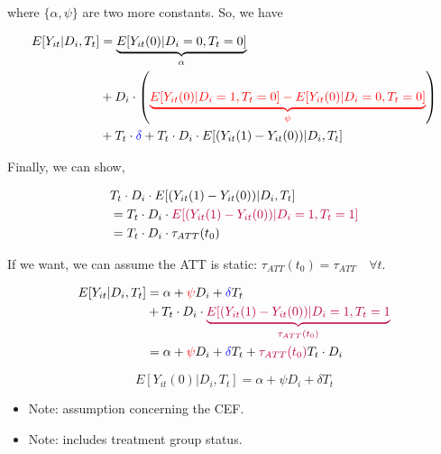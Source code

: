\documentclass[
  letterpaper,
  DIV=11,
  numbers=noendperiod]{scrreprt}
\providecommand{\tightlist}{%
  \setlength{\itemsep}{0pt}\setlength{\parskip}{0pt}}\usepackage{longtable,booktabs,array}
\theoremstyle{definition}
\theoremstyle{remark}
\begin{document}
where \(\{ \alpha, \psi \}\) are two more constants. So, we have

\[
\begin{aligned}
E[Y_{it}|D_i,T_t] &= \underbrace{E[Y_{it}(0)|D_i=0,T_t=0]}_{\alpha} \\
&+ D_i \cdot \left( \textcolor{red}{\underbrace{E[Y_{it}(0)|D_i=1,T_t=0] - E[Y_{it}(0)|D_i=0,T_t=0]}_{\psi}} \right) \\
&+ T_t \cdot \textcolor{blue}{\delta} + T_t \cdot D_i \cdot E[(Y_{it}(1)-Y_{it}(0))|D_i,T_t]
\end{aligned}
\]

Finally, we can show,

\[
\begin{aligned}
&T_t \cdot D_i \cdot E[(Y_{it}(1) - Y_{it}(0))|D_i,T_t] \\
&= T_t \cdot D_i \cdot \textcolor{purple}{E[(Y_{it}(1) - Y_{it}(0))|D_i=1,T_t=1]} \\
&= T_t \cdot D_i \cdot \tau_{ATT}(t_0) 
\end{aligned}
\]

If we want, we can assume the ATT is static:
\(\tau_{ATT}(t_0) = \tau_{ATT} \quad \forall t\).

\[
\begin{aligned}
E[Y_{it}|D_i,T_t] &= \alpha + \textcolor{red}{\psi}D_i + \textcolor{blue}{\delta}T_t \\
&+ T_t \cdot D_i \cdot \textcolor{purple}{\underbrace{E[(Y_{it}(1) - Y_{it}(0))|D_i=1,T_t=1}_{\tau_{ATT}(t_0)}} \\
&= \alpha + \textcolor{red}{\psi}D_i + \textcolor{blue}{\delta}T_t + \textcolor{purple}{\tau_{ATT}(t_0)} T_t \cdot D_i
\end{aligned}
\]

\begin{tcolorbox}[enhanced jigsaw, breakable, colframe=quarto-callout-note-color-frame, toptitle=1mm, toprule=.15mm, opacitybacktitle=0.6, opacityback=0, rightrule=.15mm, titlerule=0mm, colback=white, bottomtitle=1mm, title={Parallel Trends Assumption (Parametric version)}, arc=.35mm, coltitle=black, colbacktitle=quarto-callout-note-color!10!white, leftrule=.75mm, bottomrule=.15mm, left=2mm]

\[
E[Y_{it}(0)|D_i,T_t] = \alpha + \psi D_i + \delta T_t
\]

\end{tcolorbox}

\begin{itemize}
\tightlist
\item
  Note: assumption concerning the CEF.
\item
  Note: includes treatment group status.
\end{itemize}
\end{document}
